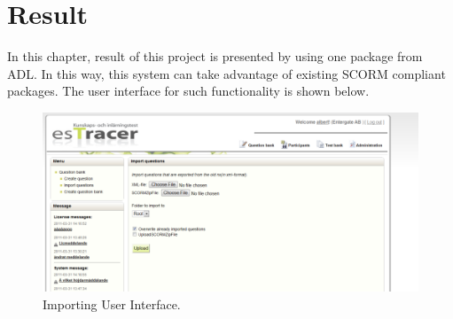 \chapter{Result}
\thispagestyle{empty}
In this chapter, result of this project is presented by using one package from ADL. In this way, this system can take advantage of existing SCORM 
compliant packages. The user interface for such functionality is shown below.
\begin{figure}[hb]
	\begin{center}
		\includegraphics[scale=0.3]{importing.png}
	\end{center}
	\caption{Importing User Interface.}
	\label{fig:importing}
\end{figure}
